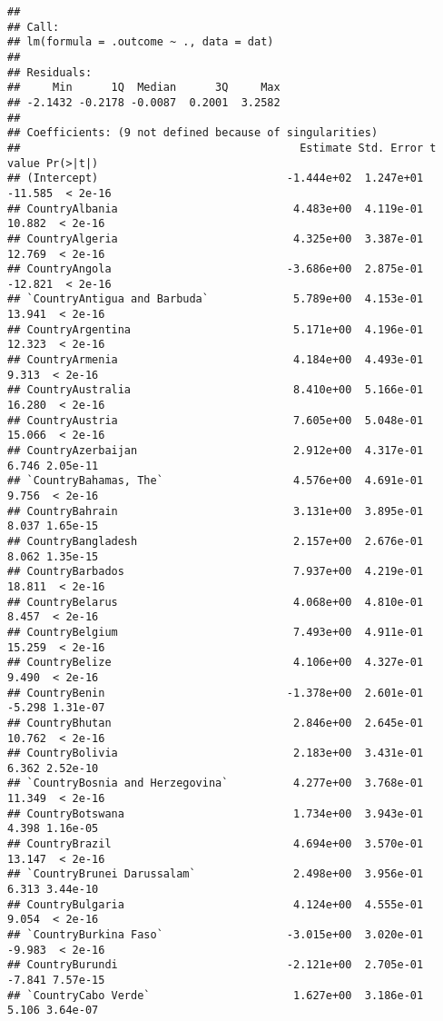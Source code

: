 \documentclass[
]{article}
\begin{document}
\begin{verbatim}
## 
## Call:
## lm(formula = .outcome ~ ., data = dat)
## 
## Residuals:
##     Min      1Q  Median      3Q     Max 
## -2.1432 -0.2178 -0.0087  0.2001  3.2582 
## 
## Coefficients: (9 not defined because of singularities)
##                                           Estimate Std. Error t value Pr(>|t|)
## (Intercept)                             -1.444e+02  1.247e+01 -11.585  < 2e-16
## CountryAlbania                           4.483e+00  4.119e-01  10.882  < 2e-16
## CountryAlgeria                           4.325e+00  3.387e-01  12.769  < 2e-16
## CountryAngola                           -3.686e+00  2.875e-01 -12.821  < 2e-16
## `CountryAntigua and Barbuda`             5.789e+00  4.153e-01  13.941  < 2e-16
## CountryArgentina                         5.171e+00  4.196e-01  12.323  < 2e-16
## CountryArmenia                           4.184e+00  4.493e-01   9.313  < 2e-16
## CountryAustralia                         8.410e+00  5.166e-01  16.280  < 2e-16
## CountryAustria                           7.605e+00  5.048e-01  15.066  < 2e-16
## CountryAzerbaijan                        2.912e+00  4.317e-01   6.746 2.05e-11
## `CountryBahamas, The`                    4.576e+00  4.691e-01   9.756  < 2e-16
## CountryBahrain                           3.131e+00  3.895e-01   8.037 1.65e-15
## CountryBangladesh                        2.157e+00  2.676e-01   8.062 1.35e-15
## CountryBarbados                          7.937e+00  4.219e-01  18.811  < 2e-16
## CountryBelarus                           4.068e+00  4.810e-01   8.457  < 2e-16
## CountryBelgium                           7.493e+00  4.911e-01  15.259  < 2e-16
## CountryBelize                            4.106e+00  4.327e-01   9.490  < 2e-16
## CountryBenin                            -1.378e+00  2.601e-01  -5.298 1.31e-07
## CountryBhutan                            2.846e+00  2.645e-01  10.762  < 2e-16
## CountryBolivia                           2.183e+00  3.431e-01   6.362 2.52e-10
## `CountryBosnia and Herzegovina`          4.277e+00  3.768e-01  11.349  < 2e-16
## CountryBotswana                          1.734e+00  3.943e-01   4.398 1.16e-05
## CountryBrazil                            4.694e+00  3.570e-01  13.147  < 2e-16
## `CountryBrunei Darussalam`               2.498e+00  3.956e-01   6.313 3.44e-10
## CountryBulgaria                          4.124e+00  4.555e-01   9.054  < 2e-16
## `CountryBurkina Faso`                   -3.015e+00  3.020e-01  -9.983  < 2e-16
## CountryBurundi                          -2.121e+00  2.705e-01  -7.841 7.57e-15
## `CountryCabo Verde`                      1.627e+00  3.186e-01   5.106 3.64e-07

\end{verbatim}
\end{document}
